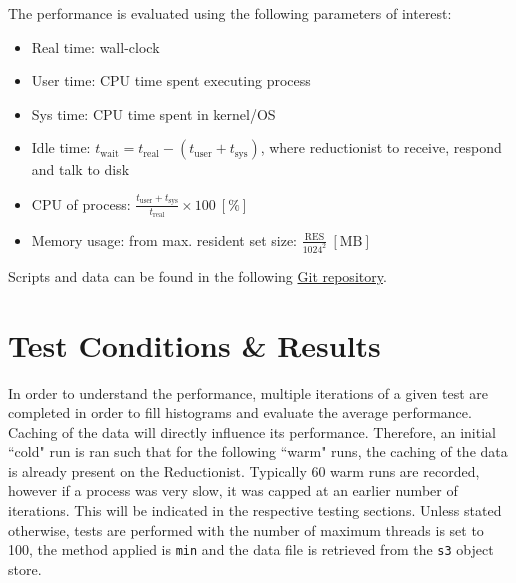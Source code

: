 \documentclass{article}
\begin{document}
\noindent The performance is evaluated using the following parameters of interest:

\begin{itemize}
    \item Real time: wall-clock
    \item User time: CPU time spent executing process
    \item Sys time: CPU time spent in kernel/OS
    \item Idle time: $t_\text{wait} = t_\text{real} - (t_\text{user} + t_\text{sys})$, where reductionist to receive, respond and talk to disk  
    \item CPU of process: $\frac{t_\text{user}+ t_\text{sys}}{t_\text{real}} \times 100~[\%]$
    \item Memory usage: from max. resident set size: $\frac{\text{RES}}{1024^2}~[\text{MB}]$
\end{itemize}

Scripts and data can be found in the following \href{https://github.com/valeriupredoi/testing_PyActiveStorage/tree/main/tests_Varsiha}{Git repository}.

\newpage



\section{Test Conditions \& Results}

In order to understand the performance, multiple iterations of a given test are completed in order to fill histograms and evaluate the average performance. Caching of the data will directly influence its performance. Therefore, an initial ``cold" run is ran such that for the following ``warm" runs, the caching of the data is already present on the Reductionist. Typically 60 warm runs are recorded, however if a process was very slow, it was capped at an earlier number of iterations. This will be indicated in the respective testing sections. Unless stated otherwise, tests are performed with the number of maximum threads is set to 100, the method applied is \texttt{min} and the data file is retrieved from the \texttt{s3} object store.


\end{document}
